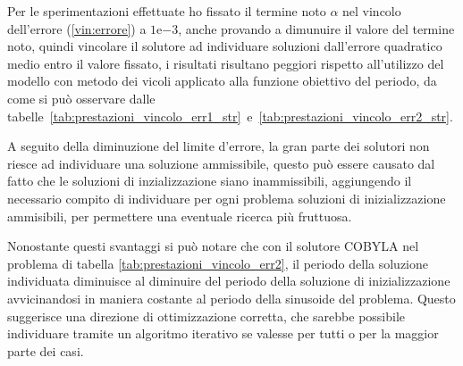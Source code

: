 \documentclass[a4paper,12pt]{report}
\newcommand{\expnumber}[2]{{#1}\mathrm{e}{#2}}
\begin{document}
Per le sperimentazioni effettuate  ho fissato il termine noto $\alpha$ nel vincolo dell'errore (\ref{vin:errore}) a $\expnumber{1}{-3}$, anche provando a dimunuire il valore del termine noto, quindi vincolare il solutore ad individuare soluzioni dall'errore quadratico medio entro il valore fissato, i risultati risultano peggiori rispetto all'utilizzo del modello con metodo dei vicoli applicato alla funzione obiettivo del periodo, da come si può osservare dalle tabelle~\ref{tab:prestazioni_vincolo_err1_str}~e~\ref{tab:prestazioni_vincolo_err2_str}.

A seguito della diminuzione del limite d'errore, la gran parte dei solutori non riesce ad individuare una soluzione ammissibile, questo può essere causato dal fatto che le soluzioni di inzializzazione siano inammissibili,  aggiungendo il necessario compito di individuare per ogni problema soluzioni di inizializzazione ammisibili, per permettere una eventuale ricerca più fruttuosa.

Nonostante questi svantaggi si può notare che con il solutore COBYLA nel problema di tabella \ref{tab:prestazioni_vincolo_err2}, il periodo della soluzione individuata diminuisce al diminuire del periodo della soluzione di inizializzazione avvicinandosi in maniera costante al periodo della sinusoide del problema.
Questo suggerisce una direzione di ottimizzazione corretta, che sarebbe possibile individuare tramite un algoritmo iterativo se valesse per tutti o per la maggior parte dei casi.
\end{document}
